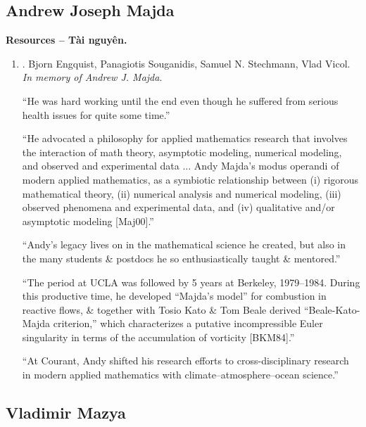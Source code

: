 \documentclass{article}
\begin{document}

\subsection{Andrew Joseph Majda}
\textbf{\textsf{Resources -- Tài nguyên.}}
\begin{enumerate}
	\item \cite{memory_Andrew_Joseph_Majda}. {\sc Bjorn Engquist, Panagiotis Souganidis, Samuel N. Stechmann, Vlad Vicol}. {\it In memory of Andrew J. Majda}.
	
	``He was hard working until the end even though he suffered from serious health issues for quite some time.''
	
	``He advocated a philosophy for applied mathematics research that involves the interaction of math theory, asymptotic modeling, numerical modeling, and observed and experimental data $\ldots$ Andy Majda's modus operandi of modern applied mathematics, as a symbiotic relationship between (i) rigorous mathematical theory, (ii) numerical analysis and numerical modeling, (iii) observed phenomena and experimental data, and (iv) qualitative and/or asymptotic modeling [Maj00].''
	
	``Andy's legacy lives on in the mathematical science he created, but also in the many students \& postdocs he so enthusiastically taught \& mentored.''
	
	``The period at UCLA was followed by 5 years at Berkeley, 1979--1984. During this productive time, he developed ``Majda's model'' for combustion in reactive flows, \& together with Tosio Kato \& Tom Beale derived ``Beale-Kato-Majda criterion,'' which characterizes a putative incompressible Euler singularity in terms of the accumulation of vorticity [BKM84].''
	
	``At Courant, Andy shifted his research efforts to cross-disciplinary research in modern applied mathematics with climate--atmosphere--ocean science.''
\end{enumerate}


\subsection{Vladimir Mazya}


\end{document}
